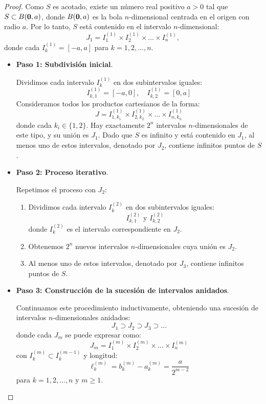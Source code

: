 \documentclass[a4paper,12pt]{article}
\begin{document}
\begin{proof}
Como $S$ es acotado, existe un número real positivo $a > 0$ tal que $S \subset B(\mathbf{0}, a)$, donde $B(\mathbf{0}, a)$ es la bola $n$-dimensional centrada en el origen con radio $a$. Por lo tanto, $S$ está contenido en el intervalo $n$-dimensional:
$$J_1 = I_1^{(1)} \times I_2^{(1)} \times \dots \times I_n^{(1)},$$
donde cada $I_k^{(1)} = [-a, a]$ para $k = 1, 2, \dots, n$.

\begin{itemize}
    \item \textbf{Paso 1: Subdivisión inicial}.

    Dividimos cada intervalo $I_k^{(1)}$ en dos subintervalos iguales:
    $$I_{k,1}^{(1)} = \left[-a, 0\right], \quad I_{k,2}^{(1)} = \left[0, a\right]$$
    Consideramos todos los productos cartesianos de la forma:
    $$J = I_{1, k_1}^{(1)} \times I_{2, k_2}^{(1)} \times \dots \times I_{n, k_n}^{(1)}$$
    donde cada $k_i \in \{1, 2\}$. Hay exactamente $2^n$ intervalos $n$-dimensionales de este tipo, y su unión es $J_1$. Dado que $S$ es infinito y está contenido en $J_1$, al menos uno de estos intervalos, denotado por $J_2$, contiene infinitos puntos de $S$.

    \item \textbf{Paso 2: Proceso iterativo}.

    Repetimos el proceso con $J_2$:
    \begin{enumerate}
        \item Dividimos cada intervalo $I_k^{(2)}$ en dos subintervalos iguales:
        $$I_{k,1}^{(2)} \text{ y } I_{k,2}^{(2)}$$
        donde $I_k^{(2)}$ es el intervalo correspondiente en $J_2$.
        \item Obtenemos $2^n$ nuevos intervalos $n$-dimensionales cuya unión es $J_2$.
        \item Al menos uno de estos intervalos, denotado por $J_3$, contiene infinitos puntos de $S$.
    \end{enumerate}

    \item \textbf{Paso 3: Construcción de la sucesión de intervalos anidados}.

    Continuamos este procedimiento inductivamente, obteniendo una sucesión de intervalos $n$-dimensionales anidados:
    $$J_1 \supset J_2 \supset J_3 \supset \dots$$
    donde cada $J_m$ se puede expresar como:
    $$J_m = I_1^{(m)} \times I_2^{(m)} \times \dots \times I_n^{(m)}$$
    con $I_k^{(m)} \subset I_k^{(m-1)}$ y longitud:
    $$\ell_k^{(m)} = b_k^{(m)} - a_k^{(m)} = \frac{a}{2^{m-2}}$$
    para $k = 1, 2, \dots, n$ y $m \geq 1$.


\end{itemize}
\end{proof}
\end{document}

